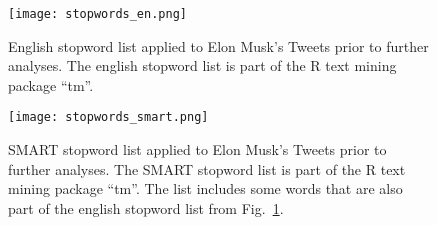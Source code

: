 \vfill
\begin{figure}[h!]
\centering
\texttt{[image: stopwords\_en.png]}
\caption{English stopword list applied to Elon Musk's Tweets prior to further analyses. The english stopword list is part of the R text mining package \enquote{tm}.}
\label{fig:stopwords_en}
\end{figure}
\vfill

\begin{figure}[h!]
\centering
\texttt{[image: stopwords\_smart.png]}
\caption{SMART stopword list applied to Elon Musk's Tweets prior to further analyses. The SMART stopword list is part of the R text mining package \enquote{tm}. The list includes some words that are also part of the english stopword list from Fig.~\ref{fig:stopwords_en}.}
\label{fig:stopwords_smart}
\end{figure}